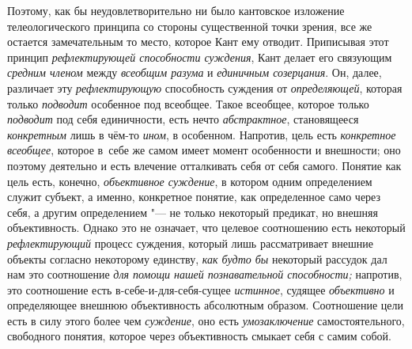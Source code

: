 Поэтому, как бы неудовлетворительно ни было кантовское
изложение телеологического принципа со стороны существенной точки зрения,
все же остается замечательным то место, которое Кант ему отводит.
Приписывая этот принцип {\em рефлектирующей способности суждения},
Кант делает его связующим {\em средним членом} между {\em всеобщим разума}
и {\em единичным созерцания}. Он, далее, различает эту
{\em рефлектирующую} способность суждения от {\em определяющей},
которая только {\em подводит} особенное под всеобщее. Такое всеобщее,
которое только {\em подводит} под себя единичности, есть нечто
{\em абстрактное}, становящееся {\em конкретным} лишь в чём-то {\em ином},
в особенном. Напротив, цель есть {\em конкретное всеобщее},
которое в~себе же самом имеет момент особенности и внешности;
оно поэтому деятельно и есть влечение отталкивать себя от себя самого.
Понятие как цель есть, конечно, {\em объективное суждение},
в котором одним определением служит субъект, а именно,
конкретное понятие, как определенное само через себя, а другим
определением "--- не только некоторый предикат, но внешняя
объективность. Однако это не означает, что целевое соотношению есть
некоторый {\em рефлектирующий} процесс суждения, который лишь рассматривает
внешние объекты согласно некоторому единству, {\em как будто бы} некоторый
рассудок дал нам это соотношение {\em для помощи нашей познавательной
способности;} напротив, это соотношение есть
в-себе-и-для-себя-сущее {\em истинное}, судящее {\em объективно}
и определяющее внешнюю объективность абсолютным образом.
Соотношение цели есть в силу этого более чем {\em суждение}, оно есть
{\em умозаключение} самостоятельного, свободного понятия, которое через
объективность смыкает себя с самим собой.

